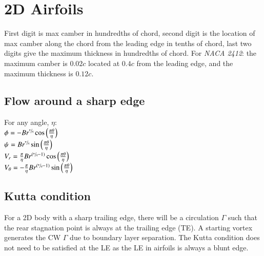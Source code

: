 \section{2D Airfoils}
First digit is max camber in hundredths of chord, second digit is the location of max camber along the chord from the leading edge in tenths of chord, last two digits give the maximum thickness in hundredths of chord. For \textit{NACA 2412}: the maximum camber is $0.02c$ located at $0.4c$ from the leading edge, and the maximum thickness is $0.12c$.
\subsection*{Flow around a sharp edge}
For any angle, $\eta$:\\
$\phi=-Br^{\sfrac{\pi}{\eta}}\cos\left(\frac{\pi\theta}{\eta}\right)$\\
$\psi=Br^{\sfrac{\pi}{\eta}}\sin\left(\frac{\pi\theta}{\eta}\right)$\\
$V_r=\frac{\pi}{\eta}Br^{(\sfrac{\pi}{\eta}-1)}\cos\left(\frac{\pi\theta}{\eta}\right)$\\
$V_\theta=-\frac{\pi}{\eta}Br^{(\sfrac{\pi}{\eta}-1)}\sin\left(\frac{\pi\theta}{\eta}\right)$
\subsection*{Kutta condition}
For a 2D body with a sharp trailing edge, there will be a circulation $\Gamma$ such that the rear stagnation point is always at the trailing edge (TE).
A starting vortex generates the CW $\Gamma$ due to boundary layer separation.
The Kutta condition does not need to be satisfied at the LE as the LE in airfoils is always a blunt edge.


